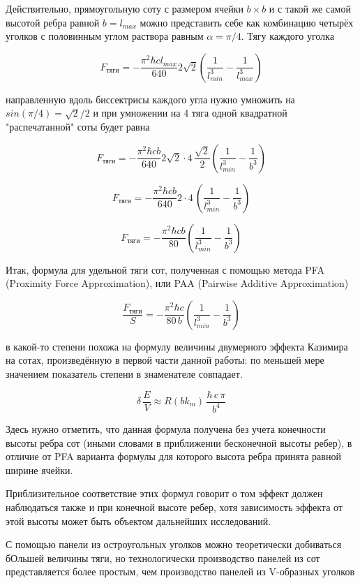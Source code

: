 \documentclass[11pt]{article}
\begin{document}
Действительно, прямоугольную соту с размером ячейки \(b \times b\) и с
такой же самой высотой ребра равной \(b = l_{max}\) можно представить
себе как комбинацию четырёх уголков с половинным углом раствора равным
\(\alpha = {\pi}/{4}\). Тягу каждого уголка

\[F_{тяги} = - \frac{\pi^2\hbar c l_{max}}{640} 2\sqrt{2} \left(\frac{1}{l_{min}^3} - \frac{1}{l_{max}^3}\right)\]

направленную вдоль биссектрисы каждого угла нужно умножить на
\(sin\left({\pi}/{4}\right)={\sqrt{2}}\big/{2}\) и при умножении на 4
тяга одной квадратной "распечатанной" соты будет равна

\[F_{тяги} = - \frac{\pi^2\hbar c b}{640} 2\sqrt{2}\cdot4\,\frac{\sqrt{2}}{2} \left(\frac{1}{l_{min}^3} - \frac{1}{b^3}\right)\]

\[F_{тяги} = - \frac{\pi^2\hbar c b}{640} 2\cdot4\,\left(\frac{1}{l_{min}^3} - \frac{1}{b^3}\right)\]

\[F_{тяги} = - \frac{\pi^2\hbar c b}{80} \left(\frac{1}{l_{min}^3} - \frac{1}{b^3}\right)\]

Итак, формула для удельной тяги сот, полученная с помощью метода PFA
(Proximity Force Approximation), или PAA (Pairwise Additive
Approximation)

\[\frac{F_{тяги}}{S} = - \frac{\pi^2\hbar c}{80\, b} \left(\frac{1}{l_{min}^3} - \frac{1}{b^3}\right)\]

в какой-то степени похожа на формулу величины двумерного эффекта
Казимира на сотах, произведённую в первой части данной работы: по
меньшей мере значением показатель степени в знаменателе совпадает.

\[\delta\,\frac{E}{V} \approx R\left(b k_m\right)\,\frac{\hbar\,c\,\pi}{b^4}\]

Здесь нужно отметить, что данная формула получена без учета конечности
высоты ребра сот (иными словами в приближении бесконечной высоты ребер),
в отличие от PFA варианта формулы для которого высота ребра принята
равной ширине ячейки.

Приблизительное соответствие этих формул говорит о том эффект должен
наблюдаться также и при конечной высоте ребер, хотя зависимость эффекта
от этой высоты может быть объектом дальнейших исследований.

С помощью панели из остроугольных уголков можно теоретически добиваться
бОльшей величины тяги, но технологически производство панелей из сот
представляется более простым, чем производство панелей из V-образных
уголков
\end{document}
